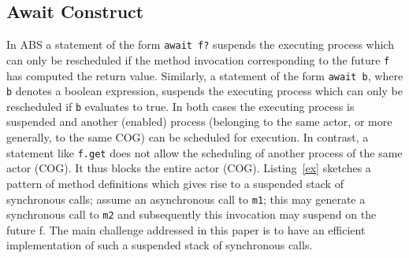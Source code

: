 





\subsection{Await Construct}
In ABS a statement of the form \lstinline|await f?|
suspends the executing process which can only be rescheduled if the method
invocation corresponding to the future \lstinline|f| has computed the return value.
Similarly, a statement of the form \lstinline|await b|, where \lstinline|b| denotes a boolean expression, suspends the executing process which can only be rescheduled if \lstinline|b| evaluates to true. In both cases the executing process is suspended and another (enabled) process (belonging to the same actor, or more generally, to the same COG) can be scheduled for execution.
In contrast, a statement like \lstinline|f.get| does not allow the scheduling of
another process of the same actor (COG). It thus blocks the entire actor (COG). Listing~\ref{ex} sketches a pattern of method definitions which gives rise to a suspended stack of synchronous calls; assume an asynchronous call to \lstinline|m1|; this may generate a synchronous call to \lstinline|m2| and subsequently this invocation may suspend on the future f. The main challenge addressed in this paper is to have an efficient implementation of such a suspended stack of synchronous calls.

